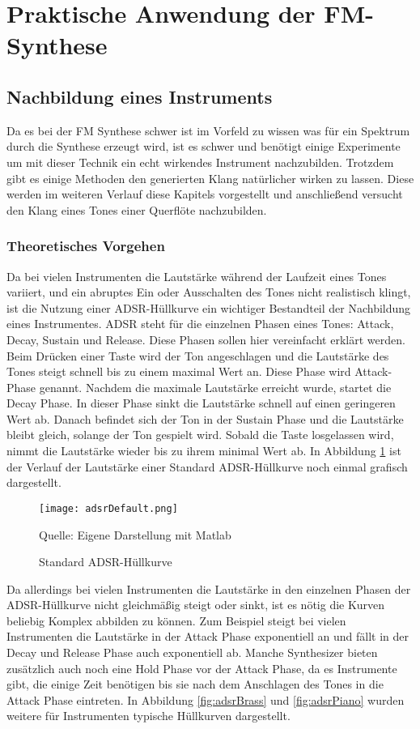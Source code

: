 \section{Praktische Anwendung der FM-Synthese}
\FloatBarrier
\subsection{Nachbildung eines Instruments}
Da es bei der FM Synthese schwer ist im Vorfeld zu wissen was für ein Spektrum durch die Synthese erzeugt wird, ist es schwer und benötigt einige Experimente um mit dieser Technik ein echt wirkendes Instrument nachzubilden.
Trotzdem gibt es einige Methoden den generierten Klang natürlicher wirken zu lassen. Diese werden im weiteren Verlauf diese Kapitels vorgestellt und anschließend versucht den Klang eines Tones einer Querflöte nachzubilden.

\FloatBarrier
\subsubsection{Theoretisches Vorgehen}

Da bei vielen Instrumenten die Lautstärke während der Laufzeit eines Tones variiert, und ein abruptes Ein oder Ausschalten des Tones nicht realistisch klingt, ist die Nutzung einer ADSR-Hüllkurve ein wichtiger Bestandteil der Nachbildung eines Instrumentes. ADSR steht für die einzelnen Phasen eines Tones: Attack, Decay, Sustain und Release. Diese Phasen sollen hier vereinfacht erklärt werden. Beim Drücken einer Taste wird der Ton angeschlagen und die Lautstärke des Tones steigt schnell bis zu einem maximal Wert an. Diese Phase wird Attack-Phase genannt. Nachdem die maximale Lautstärke erreicht wurde, startet die Decay Phase. In dieser Phase sinkt die Lautstärke schnell auf einen geringeren Wert ab. Danach befindet sich der Ton in der Sustain Phase und die Lautstärke bleibt gleich, solange der Ton gespielt wird. Sobald die Taste losgelassen wird, nimmt die Lautstärke wieder bis zu ihrem minimal Wert ab. In Abbildung \ref{fig:adsrDefault} ist der Verlauf der Lautstärke einer Standard ADSR-Hüllkurve noch einmal grafisch dargestellt.

\begin{figure} [ht]
\centering
  \texttt{[image: adsrDefault.png]}
\caption{Standard ADSR-Hüllkurve}
\label{fig:adsrDefault}
Quelle: Eigene Darstellung mit Matlab
\end{figure}

Da allerdings bei vielen Instrumenten die Lautstärke in den einzelnen Phasen der ADSR-Hüllkurve nicht gleichmäßig steigt oder sinkt, ist es nötig die Kurven beliebig Komplex abbilden zu können. Zum Beispiel steigt bei vielen Instrumenten die Lautstärke in der Attack Phase exponentiell an und fällt in der Decay und Release Phase auch exponentiell ab. Manche Synthesizer bieten zusätzlich auch noch eine Hold Phase vor der Attack Phase, da es Instrumente gibt, die einige Zeit benötigen bis sie nach dem Anschlagen des Tones in die Attack Phase eintreten. In Abbildung \ref{fig:adsrBrass} und \ref{fig:adsrPiano} wurden weitere für Instrumenten typische Hüllkurven dargestellt.


